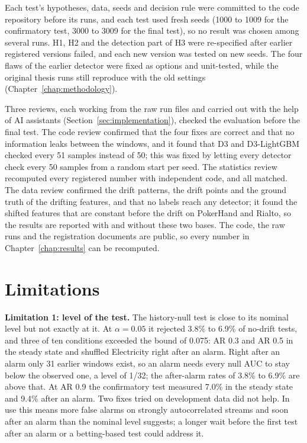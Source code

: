 Each test's hypotheses, data, seeds and decision rule were committed to the code repository before its runs, and each test used fresh seeds (1000 to 1009 for the confirmatory test, 3000 to 3009 for the final test), so no result was chosen among several runs. H1, H2 and the detection part of H3 were re-specified after earlier registered versions failed, and each new version was tested on new seeds. The four flaws of the earlier detector were fixed as options and unit-tested, while the original thesis runs still reproduce with the old settings (Chapter~\ref{chap:methodology}).

Three reviews, each working from the raw run files and carried out with the help of AI assistants (Section~\ref{sec:implementation}), checked the evaluation before the final test. The code review confirmed that the four fixes are correct and that no information leaks between the windows, and it found that D3 and D3-LightGBM checked every 51 samples instead of 50; this was fixed by letting every detector check every 50 samples from a random start per seed. The statistics review recomputed every registered number with independent code, and all matched. The data review confirmed the drift patterns, the drift points and the ground truth of the drifting features, and that no labels reach any detector; it found the shifted features that are constant before the drift on PokerHand and Rialto, so the results are reported with and without these two bases. The code, the raw runs and the registration documents are public, so every number in Chapter~\ref{chap:results} can be recomputed.

\section{Limitations}
\label{sec:limitations}

\textbf{Limitation 1: level of the test.} The history-null test is close to its nominal level but not exactly at it. At $\alpha = 0.05$ it rejected 3.8\% to 6.9\% of no-drift tests, and three of ten conditions exceeded the bound of 0.075: AR 0.3 and AR 0.5 in the steady state and shuffled Electricity right after an alarm. Right after an alarm only 31 earlier windows exist, so an alarm needs every null AUC to stay below the observed one, a level of 1/32; the after-alarm rates of 3.8\% to 6.9\% are above that. At AR 0.9 the confirmatory test measured 7.0\% in the steady state and 9.4\% after an alarm. Two fixes tried on development data did not help. In use this means more false alarms on strongly autocorrelated streams and soon after an alarm than the nominal level suggests; a longer wait before the first test after an alarm or a betting-based test could address it.

